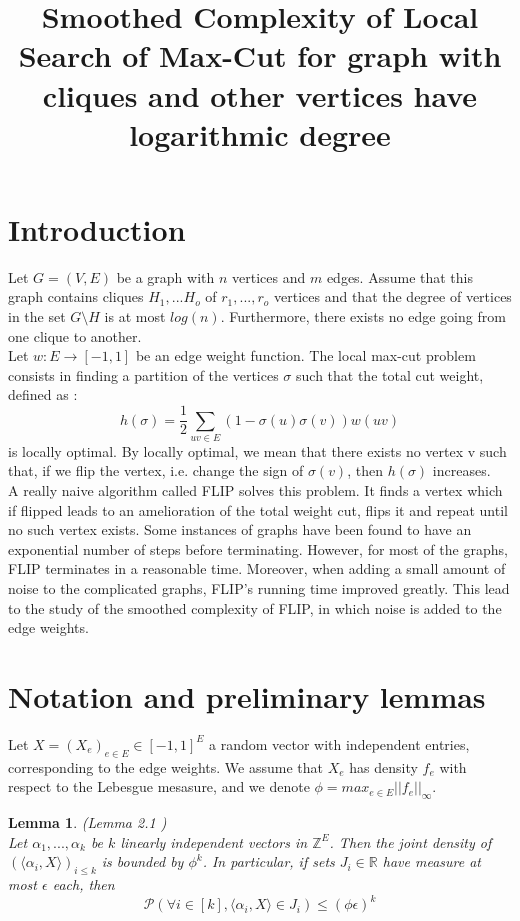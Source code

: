 \documentclass[12pt]{article}
\title{Smoothed Complexity of Local Search of Max-Cut for graph with cliques and other  vertices have logarithmic degree}
\newtheorem{lemma}[theorem]{Lemma}
\begin{document}
\maketitle

\section{Introduction}

Let $G = (V,E)$ be a graph with $n$ vertices and $m$ edges. Assume that this graph contains cliques $H_1, ... H_o$ of $r_1, ... , r_o$ vertices and that the degree of vertices in the set $G \setminus H$ is at most $log(n)$. Furthermore, there exists no edge going from one clique to another.\\
Let $w : E \rightarrow [-1, 1]$ be an edge weight function. The local max-cut problem consists in finding a partition of the vertices $\sigma$ such that the total cut weight, defined as :
\begin{equation*}
h(\sigma) = \dfrac{1}{2}\sum_{uv \in E}(1 - \sigma(u)\sigma(v))w(uv)
\end{equation*}
is locally optimal. By locally optimal, we mean that there exists no vertex v such that, if we flip the vertex, i.e. change the sign of $\sigma(v)$, then $h(\sigma)$ increases.\\ 

A really naive algorithm called FLIP solves this problem. It finds a vertex which if flipped leads to an amelioration of the total weight cut, flips it and repeat until no such vertex exists. Some instances of graphs have been found to have an exponential number of steps before terminating. However, for most of the graphs, FLIP terminates in a reasonable time. Moreover, when adding a small amount of noise to the complicated graphs, FLIP's running time improved greatly. This lead to the study of the smoothed complexity of FLIP, in which noise is added to the edge weights.

\section{Notation and preliminary lemmas}

Let $X = (X_e)_{e \in E} \in [-1, 1]^E$ a random vector with independent entries, corresponding to the edge weights. We assume that $X_e$ has density $f_e$ with respect to the Lebesgue mesasure, and we denote $\phi = max_{e \in E}||f_e||_\infty$. 

\begin{lemma} (Lemma 2.1 \cite{angel2016local})\\
\label{noise}
Let $\alpha_1, ..., \alpha_k$ be $k$ linearly independent vectors in $\mathbb{Z}^E$. Then the joint density of$ (\langle \alpha_i, X \rangle)_{i \leq k}$ is bounded by $\phi^k$. In particular, if sets $J_i \in \mathbb R$ have measure at most $\epsilon$ each, then 
\begin{equation*}
\mathcal{P} (\forall i \in [k], \langle \alpha_i, X \rangle \in J_i) \leq (\phi \epsilon)^k
\end{equation*}
\end{lemma}
\end{document}
